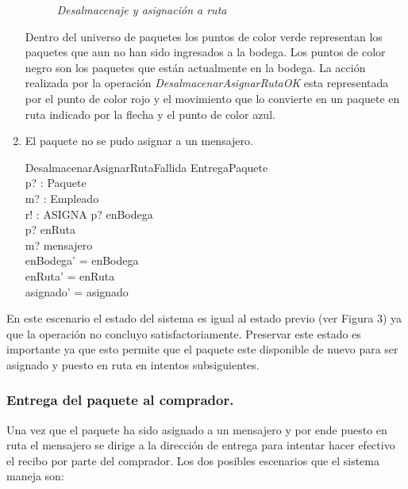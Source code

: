 \documentclass[12pt,a4paper]{article}
\begin{document}
\begin{enumerate}
\begin{figure}[h]
\caption{\textit{Desalmacenaje y asignación a ruta}} \label{fig:M1}
\end{figure}
Dentro del universo de paquetes los puntos de color verde representan los paquetes que aun no han sido ingresados a la bodega. Los puntos de color negro son los paquetes que están actualmente en la bodega. La acción realizada por la operación \textit{DesalmacenarAsignarRutaOK} esta representada por el punto de color rojo y el movimiento que lo convierte en un paquete en ruta indicado por la flecha y el punto de color azul.

\item El paquete no se pudo asignar a un mensajero.

\begin{schema}{DesalmacenarAsignarRutaFallida}
\Xi EntregaPaquete\\
p? : Paquete\\
m? : Empleado\\
r! : ASIGNA
\where
p? \in enBodega\\
p? \notin  enRuta\\
m? \in mensajero\\
enBodega' = enBodega\\
enRuta' = enRuta\\
asignado' = asignado
\end{schema}
\end{enumerate}

En este escenario el estado del sistema es igual al estado previo (ver Figura 3) ya que la operación no concluyo satisfactoriamente. Preservar este estado es importante ya que esto permite que el paquete este disponible de nuevo para ser asignado y puesto en ruta en intentos subsiguientes.

\subsubsection{Entrega del paquete al comprador.}
Una vez que el paquete ha sido asignado a un mensajero y por ende puesto en ruta el mensajero se dirige a la dirección de entrega para intentar hacer efectivo el recibo por parte del comprador. Los dos posibles escenarios que el sistema maneja son:
\end{document}
